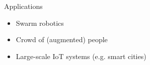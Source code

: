 \begin{frame}{Applications}
  \begin{card}
    \begin{itemize}
      \item Swarm robotics
      \item Crowd of (augmented) people
      \item Large-scale IoT systems (e.g. smart cities)
    \end{itemize}
  \end{card}
  \begin{columns}
    \begin{column}{0.3\textwidth}
    \end{column}
    \begin{column}{0.3\textwidth}
    \end{column}
    \begin{column}{0.3\textwidth}
    \end{column}
  \end{columns}
\end{frame}